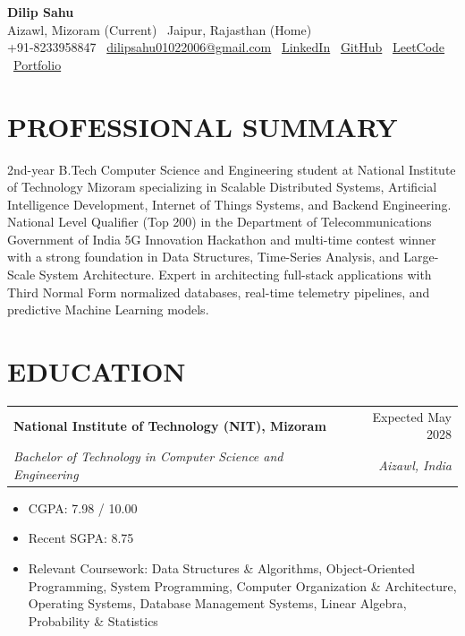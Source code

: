 \documentclass[11pt,letterpaper]{article}
\newcommand{\resumeSubheading}[4]{
\vspace{2pt}
\begin{tabularx}{\textwidth}{X r}
\textbf{#1} & #2 \\
\textit{#3} & \textit{#4}
\end{tabularx}
\vspace{-3pt}
}
\newcommand{\resumeItem}[1]{
\item #1
}
\newcommand{\resumeItemListStart}{
\begin{itemize}[leftmargin=0.22in,itemsep=1pt,topsep=2pt]
}
\newcommand{\resumeItemListEnd}{
\end{itemize}
}
\begin{document}

\begin{center}
{\Huge \textbf{Dilip Sahu}} \\[4pt]

Aizawl, Mizoram (Current) \textbar\ Jaipur, Rajasthan (Home) \\[6pt]

+91-8233958847 \textbar\
\href{mailto:dilipsahu01022006@gmail.com}{dilipsahu01022006@gmail.com}
\textbar\
\href{https://www.linkedin.com/in/dilip-sahu-7b8789324/}{LinkedIn}
\textbar\
\href{https://github.com/Dilipsahu01}{GitHub}
\textbar\
\href{https://leetcode.com/}{LeetCode}
\textbar\
\href{https://dilipsahu01.github.io/}{Portfolio}
\end{center}


\section{PROFESSIONAL SUMMARY}

2nd-year B.Tech Computer Science and Engineering student at National Institute of Technology Mizoram specializing in Scalable Distributed Systems, Artificial Intelligence Development, Internet of Things Systems, and Backend Engineering. National Level Qualifier (Top 200) in the Department of Telecommunications Government of India 5G Innovation Hackathon and multi-time contest winner with a strong foundation in Data Structures, Time-Series Analysis, and Large-Scale System Architecture. Expert in architecting full-stack applications with Third Normal Form normalized databases, real-time telemetry pipelines, and predictive Machine Learning models.


\section{EDUCATION}

\resumeSubheading
{National Institute of Technology (NIT), Mizoram}
{Expected May 2028}
{Bachelor of Technology in Computer Science and Engineering}
{Aizawl, India}

\resumeItemListStart
\resumeItem{CGPA: 7.98 / 10.00}
\resumeItem{Recent SGPA: 8.75}
\resumeItem{Relevant Coursework: Data Structures \& Algorithms, Object-Oriented Programming, System Programming, Computer Organization \& Architecture, Operating Systems, Database Management Systems, Linear Algebra, Probability \& Statistics}
\resumeItemListEnd
\end{document}

